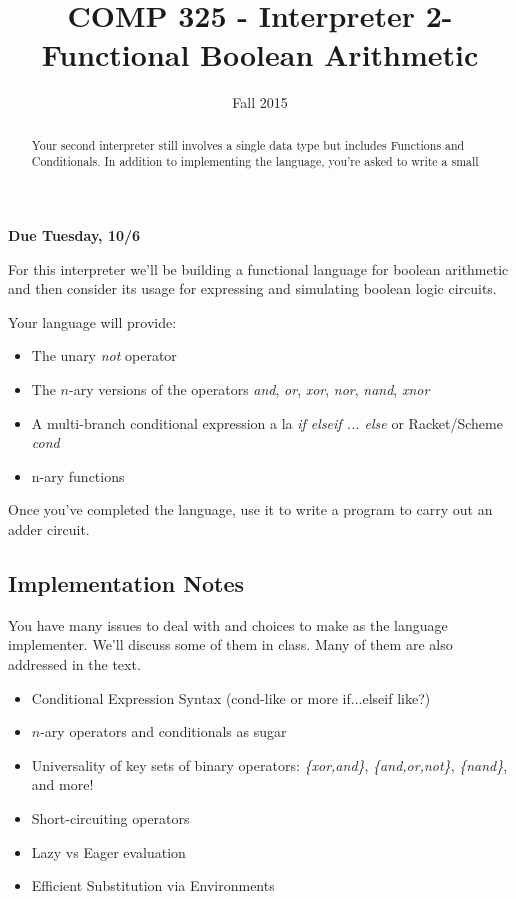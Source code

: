 \documentclass[10pt]{article}
\title{COMP 325 - Interpreter 2- Functional Boolean Arithmetic}
\author{  }
\date{Fall 2015}
\begin{document}
\maketitle

\begin{abstract}
Your second interpreter still involves a single data type but includes Functions and Conditionals.  In addition to implementing the language, you're asked to write a small 
\end{abstract}

\begin{center}
\textbf{Due Tuesday, 10/6}
\end{center}

For this interpreter we'll be building a functional language for boolean arithmetic and then consider its usage for expressing and simulating boolean logic circuits.  

Your language will provide:
\begin{itemize}
\item The unary \textit{not} operator
\item The $n$-ary versions of the operators \textit{and}, \textit{or}, \textit{xor}, \textit{nor}, \textit{nand}, \textit{xnor}
\item A multi-branch conditional expression a la \textit{if elseif ... else} or Racket/Scheme \textit{cond}
\item n-ary functions 
\end{itemize}

Once you've completed the language, use it to write a program to carry out an adder circuit.

\subsection{Implementation Notes}

You have many issues to deal with and choices to make as the language implementer. We'll discuss some of them in class. Many of them are also addressed in the text. 
\begin{itemize}
\item Conditional Expression Syntax (cond-like or more if...elseif like?)
\item $n$-ary operators and conditionals as sugar 
\item Universality of key sets of binary operators: \textit{\{xor,and\}}, \textit{\{and,or,not\}}, \textit{\{nand\}}, and more!
\item Short-circuiting operators
\item Lazy vs Eager evaluation
\item Efficient Substitution via Environments
\end{itemize}
\end{document}
